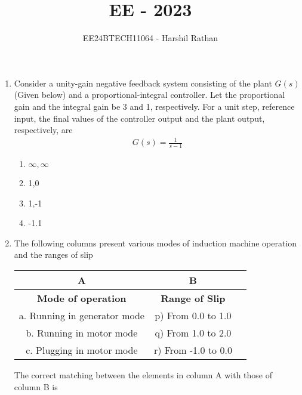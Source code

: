 \documentclass[journal]{IEEEtran}
\renewcommand{\thefigure}{\theenumi}
\renewcommand{\thetable}{\theenumi}
\numberwithin{equation}{enumi}
\numberwithin{figure}{enumi}
\renewcommand{\thetable}{\theenumi}
\begin{document}

\vspace{3cm}

\title{EE - 2023}
\author{EE24BTECH11064 - Harshil Rathan}
\maketitle

\bigskip

\renewcommand{\thefigure}{\theenumi}
\renewcommand{\thetable}{\theenumi}


\begin{enumerate}
    \item Consider a unity-gain negative feedback system consisting of the plant $G(s)$(Given below) and a proportional-integral controller. Let the proportional gain and the integral gain be 3 and 1, respectively. For a unit step, reference input, the final values of the controller output and the plant output, respectively, are 
    \begin{align*}
        G(s)=\frac{1}{s-1}
    \end{align*}
    \begin{multicols}{2}
    \begin{enumerate}
            \item $\infty,\infty$
            \item 1,0
             \item 1,-1
            \item -1.1
    \end{enumerate}
    \end{multicols}
    \bigskip
\item The following columns present various modes of induction machine operation and the ranges of slip
\begin{center}
\begin{tabular}{|c|c|c|}
\hline
\multicolumn{1}{|c|}{\textbf{A}} & \multicolumn{1}{c|}{\textbf{B}} \\
\hline
\textbf{Mode of operation} &  \textbf{Range of Slip} \\
\hline
a.  Running in generator mode & p) From 0.0 to 1.0 \\
b. Running in motor mode     & q) From 1.0 to 2.0 \\
c.  Plugging in motor mode    & r) From -1.0 to 0.0 \\
\hline
\end{tabular}
\end{center}
The correct matching between the elements in column A with those of column B is

\end{enumerate}
\end{document}
